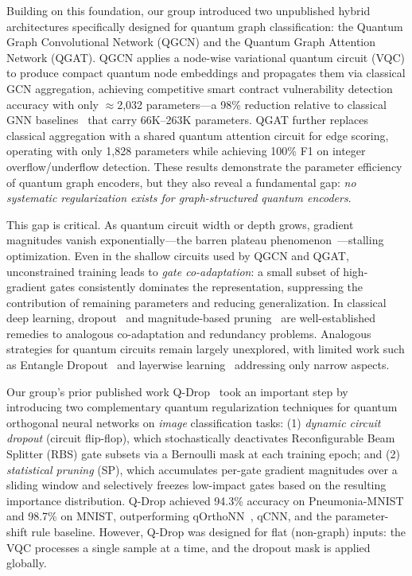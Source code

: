 \documentclass[journal]{IEEEtran}
\begin{document}
Building on this foundation, our group introduced two unpublished hybrid
architectures specifically designed for quantum graph classification:
the Quantum Graph Convolutional Network (QGCN) and the
Quantum Graph Attention Network (QGAT). QGCN applies a
node-wise variational quantum circuit (VQC) to produce compact quantum
node embeddings and propagates them via classical GCN aggregation,
achieving competitive smart contract vulnerability detection accuracy
with only $\approx$2,032 parameters---a 98\% reduction relative to
classical GNN baselines~\cite{Zhuang2020IJCAI,Liu2021IJCAI,Liu2021TKDE,
Qian2023WWW} that carry 66K--263K parameters. QGAT further replaces
classical aggregation with a shared quantum attention circuit for edge
scoring, operating with only 1,828 parameters while achieving
100\% F1 on integer overflow/underflow
detection. These results demonstrate the parameter
efficiency of quantum graph encoders, but they also reveal a
fundamental gap: \emph{no systematic regularization exists for
graph-structured quantum encoders}.

This gap is critical. As quantum circuit width or depth grows,
gradient magnitudes vanish exponentially---the barren plateau
phenomenon~\cite{McClean2018}---stalling optimization. Even in the
shallow circuits used by QGCN and QGAT, unconstrained training leads
to \emph{gate co-adaptation}: a small subset of high-gradient gates
consistently dominates the representation, suppressing the contribution
of remaining parameters and reducing generalization. In classical deep
learning, dropout~\cite{Srivastava2014} and magnitude-based
pruning~\cite{Han2015,LeCun1990OBD} are well-established remedies to
analogous co-adaptation and redundancy problems. Analogous strategies
for quantum circuits remain largely unexplored, with limited work such
as Entangle Dropout~\cite{EntangleDropout} and layerwise
learning~\cite{Skolik2021} addressing only narrow aspects.

Our group's prior published work Q-Drop~\cite{QDrop2025ICC} took an
important step by introducing two complementary quantum regularization
techniques for quantum orthogonal neural networks on \emph{image}
classification tasks: (1) \emph{dynamic circuit dropout} (circuit
flip-flop), which stochastically deactivates Reconfigurable Beam
Splitter (RBS) gate subsets via a Bernoulli mask at each training
epoch; and (2) \emph{statistical pruning} (SP), which accumulates
per-gate gradient magnitudes over a sliding window and selectively
freezes low-impact gates based on the resulting importance distribution.
Q-Drop achieved 94.3\% accuracy on Pneumonia-MNIST and 98.7\% on
MNIST, outperforming qOrthoNN~\cite{Kerenidis2020QONN}, qCNN, and
the parameter-shift rule baseline. However, Q-Drop was designed
for flat (non-graph) inputs: the VQC processes a single sample at a
time, and the dropout mask is applied globally.
\end{document}
